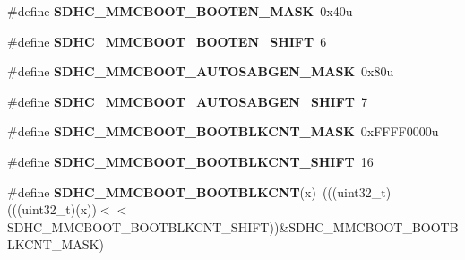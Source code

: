 \begin{DoxyCompactItemize}
\item 
\#define {\bfseries S\+D\+H\+C\+\_\+\+M\+M\+C\+B\+O\+O\+T\+\_\+\+B\+O\+O\+T\+E\+N\+\_\+\+M\+A\+SK}~0x40u\hypertarget{group__SDHC__Register__Masks_ga0e740cc62404161ed68d4ce1ecf30971}{}\label{group__SDHC__Register__Masks_ga0e740cc62404161ed68d4ce1ecf30971}

\item 
\#define {\bfseries S\+D\+H\+C\+\_\+\+M\+M\+C\+B\+O\+O\+T\+\_\+\+B\+O\+O\+T\+E\+N\+\_\+\+S\+H\+I\+FT}~6\hypertarget{group__SDHC__Register__Masks_ga1c83fde2fa55c8091ecd1768300614be}{}\label{group__SDHC__Register__Masks_ga1c83fde2fa55c8091ecd1768300614be}

\item 
\#define {\bfseries S\+D\+H\+C\+\_\+\+M\+M\+C\+B\+O\+O\+T\+\_\+\+A\+U\+T\+O\+S\+A\+B\+G\+E\+N\+\_\+\+M\+A\+SK}~0x80u\hypertarget{group__SDHC__Register__Masks_gaf80857b20ac681cf157b8012b2cbaaa3}{}\label{group__SDHC__Register__Masks_gaf80857b20ac681cf157b8012b2cbaaa3}

\item 
\#define {\bfseries S\+D\+H\+C\+\_\+\+M\+M\+C\+B\+O\+O\+T\+\_\+\+A\+U\+T\+O\+S\+A\+B\+G\+E\+N\+\_\+\+S\+H\+I\+FT}~7\hypertarget{group__SDHC__Register__Masks_ga2115330345a0a216c1d1721e84b32ea2}{}\label{group__SDHC__Register__Masks_ga2115330345a0a216c1d1721e84b32ea2}

\item 
\#define {\bfseries S\+D\+H\+C\+\_\+\+M\+M\+C\+B\+O\+O\+T\+\_\+\+B\+O\+O\+T\+B\+L\+K\+C\+N\+T\+\_\+\+M\+A\+SK}~0x\+F\+F\+F\+F0000u\hypertarget{group__SDHC__Register__Masks_ga29920c6061ebeaf7ebbba8dadf5bdf21}{}\label{group__SDHC__Register__Masks_ga29920c6061ebeaf7ebbba8dadf5bdf21}

\item 
\#define {\bfseries S\+D\+H\+C\+\_\+\+M\+M\+C\+B\+O\+O\+T\+\_\+\+B\+O\+O\+T\+B\+L\+K\+C\+N\+T\+\_\+\+S\+H\+I\+FT}~16\hypertarget{group__SDHC__Register__Masks_ga353934078a055823e50cdc2564097c67}{}\label{group__SDHC__Register__Masks_ga353934078a055823e50cdc2564097c67}

\item 
\#define {\bfseries S\+D\+H\+C\+\_\+\+M\+M\+C\+B\+O\+O\+T\+\_\+\+B\+O\+O\+T\+B\+L\+K\+C\+NT}(x)~(((uint32\+\_\+t)(((uint32\+\_\+t)(x))$<$$<$S\+D\+H\+C\+\_\+\+M\+M\+C\+B\+O\+O\+T\+\_\+\+B\+O\+O\+T\+B\+L\+K\+C\+N\+T\+\_\+\+S\+H\+I\+FT))\&S\+D\+H\+C\+\_\+\+M\+M\+C\+B\+O\+O\+T\+\_\+\+B\+O\+O\+T\+B\+L\+K\+C\+N\+T\+\_\+\+M\+A\+SK)\hypertarget{group__SDHC__Register__Masks_ga00e933a4a9d5f27c2e1ef6700777e0ea}{}\label{group__SDHC__Register__Masks_ga00e933a4a9d5f27c2e1ef6700777e0ea}


\end{DoxyCompactItemize}
